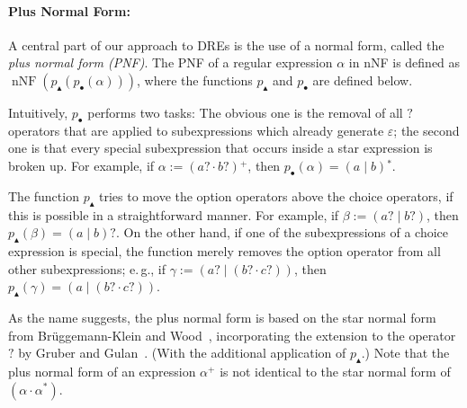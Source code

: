 \documentclass[a4paper,11pt, svgnames,titlepage]{article}
\newcommand{\rxp}{{^\mathtt{+}}}
\newcommand{\rxs}{{^\mathtt{*}}}
\newcommand{\rxo}{\mathtt{?}}
\newcommand{\rxc}{\cdot}
\DeclareMathOperator{\ror}{\mathtt{|}}
\newcommand{\emptyword}{\varepsilon}
\newcommand{\df}{:=}
\newcommand{\wpnffun}{p_{\bullet}}
\newcommand{\pnfupfun}{p_{\blacktriangle}}
\newcommand{\wpnf}[1]{\wpnffun{\left(#1\right)}}
\newcommand{\pnfup}[1]{\pnfupfun{\left(#1\right)}}
\DeclareMathOperator{\nnf}{nNF}
\begin{document}
\paragraph{Plus Normal Form:} A central part of our approach to DREs is the use of a normal form, called the \emph{plus normal form (PNF)}. The PNF of a regular expression $\alpha$ in nNF is defined as $\nnf(\pnfup{\wpnf{\alpha}})$, where the functions $\pnfupfun$ and $\wpnffun$ are defined below. 

Intuitively, $\wpnffun$ performs two tasks: The obvious one is the removal of all $\rxo$ operators that are applied to subexpressions which already generate $\emptyword$; the second one is that every special subexpression that occurs inside a star expression is broken up. For example, if $\alpha\df (a\rxo \rxc b\rxo)\rxp$, then $\wpnf{\alpha}= (a\ror b)\rxs$.

The function $\pnfupfun$ tries to move the option operators above the choice operators, if this is possible in a straightforward manner. For example, if $\beta\df (a\rxo \ror b\rxo)$, then $\pnfup{\beta}=(a\ror b)\rxo$. On the other hand, if one of the subexpressions of a choice expression is special, the function merely removes the option operator from all other subexpressions; e.\,g., if $\gamma\df ( a\rxo \ror (b\rxo\rxc c\rxo))$, then $\pnfup{\gamma}=(a \ror (b\rxo\rxc c\rxo) )$.

As the name suggests, the plus normal form is based on the star normal form from Brüggemann-Klein and Wood~\cite{bru:one}, incorporating the extension to the operator $\rxo$ by Gruber and Gulan~\cite{gru:sim}. (With the additional application of $\pnfupfun$.) Note that the plus normal form of an expression $\alpha\rxp$ is not identical to the star normal form of $(\alpha \rxc \alpha\rxs)$. 
\end{document}
